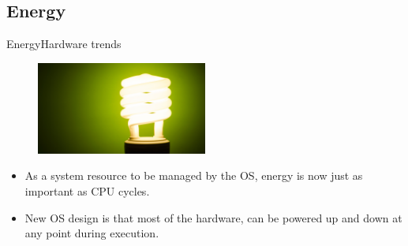 \documentclass[10pt]{beamer}
\begin{document}
\subsection{Energy}
\begin{frame}{Energy}{Hardware trends}
  \begin{figure}[ht]
    \includegraphics[width=0.5\textwidth, keepaspectratio=true]{images/energy.png}
  \end{figure} \pause

  \begin{itemize}
    \item As a system resource to be managed by the OS, energy is now just as
          important as CPU cycles. \pause
    \item New OS design is that most of the hardware, can be powered up and
          down at any point during execution.
  \end{itemize}
\end{frame}


\end{document}
